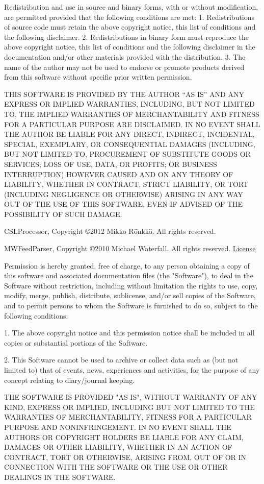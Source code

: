 \documentclass[oneside, openany, 12pt]{tufte-book}
\newcommand{\licensetext}{\scriptsize \setlength{\parskip}{0mm} \singlespacing}
\begin{document}
{\licensetext
Redistribution and use in source and binary forms, with or without
modification, are permitted provided that the following conditions
are met:
1. Redistributions of source code must retain the above copyright
   notice, this list of conditions and the following disclaimer.
2. Redistributions in binary form must reproduce the above copyright
   notice, this list of conditions and the following disclaimer in the
   documentation and/or other materials provided with the distribution.
3. The name of the author may not be used to endorse or promote products
   derived from this software without specific prior written permission.

THIS SOFTWARE IS PROVIDED BY THE AUTHOR ``AS IS'' AND ANY EXPRESS OR
IMPLIED WARRANTIES, INCLUDING, BUT NOT LIMITED TO, THE IMPLIED WARRANTIES
OF MERCHANTABILITY AND FITNESS FOR A PARTICULAR PURPOSE ARE DISCLAIMED.
IN NO EVENT SHALL THE AUTHOR BE LIABLE FOR ANY DIRECT, INDIRECT,
INCIDENTAL, SPECIAL, EXEMPLARY, OR CONSEQUENTIAL DAMAGES (INCLUDING, BUT
NOT LIMITED TO, PROCUREMENT OF SUBSTITUTE GOODS OR SERVICES; LOSS OF USE,
DATA, OR PROFITS; OR BUSINESS INTERRUPTION) HOWEVER CAUSED AND ON ANY
THEORY OF LIABILITY, WHETHER IN CONTRACT, STRICT LIABILITY, OR TORT
(INCLUDING NEGLIGENCE OR OTHERWISE) ARISING IN ANY WAY OUT OF THE USE OF
THIS SOFTWARE, EVEN IF ADVISED OF THE POSSIBILITY OF SUCH DAMAGE.
}

CSLProcessor, Copyright \copyright 2012 Mikko R\"onkk\"o. All rights reserved.

MWFeedParser, Copyright \copyright 2010 Michael Waterfall. All rights reserved. \href{https://github.com/mwaterfall/MWFeedParser/blob/master/LICENSE.txt}{License} 

{\licensetext
Permission is hereby granted, free of charge, to any person obtaining a copy
of this software and associated documentation files (the "Software"), to deal
in the Software without restriction, including without limitation the rights
to use, copy, modify, merge, publish, distribute, sublicense, and/or sell
copies of the Software, and to permit persons to whom the Software is
furnished to do so, subject to the following conditions:

1. The above copyright notice and this permission notice shall be included
   in all copies or substantial portions of the Software.

2. This Software cannot be used to archive or collect data such as (but not
   limited to) that of events, news, experiences and activities, for the 
   purpose of any concept relating to diary/journal keeping.

THE SOFTWARE IS PROVIDED "AS IS", WITHOUT WARRANTY OF ANY KIND, EXPRESS OR
IMPLIED, INCLUDING BUT NOT LIMITED TO THE WARRANTIES OF MERCHANTABILITY,
FITNESS FOR A PARTICULAR PURPOSE AND NONINFRINGEMENT. IN NO EVENT SHALL THE
AUTHORS OR COPYRIGHT HOLDERS BE LIABLE FOR ANY CLAIM, DAMAGES OR OTHER
LIABILITY, WHETHER IN AN ACTION OF CONTRACT, TORT OR OTHERWISE, ARISING FROM,
OUT OF OR IN CONNECTION WITH THE SOFTWARE OR THE USE OR OTHER DEALINGS IN
THE SOFTWARE.}
\end{document}
